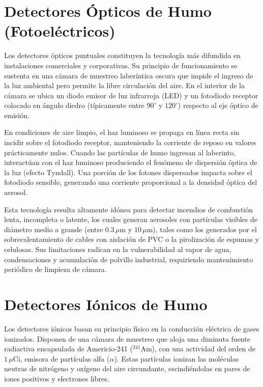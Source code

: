 \section{Detectores Ópticos de Humo (Fotoeléctricos)}

Los detectores ópticos puntuales constituyen la tecnología más difundida en instalaciones comerciales y corporativas. Su
principio de funcionamiento se sustenta en una cámara de muestreo laberíntica oscura que impide el ingreso de la luz
ambiental pero permite la libre circulación del aire. En el interior de la cámara se ubica un diodo emisor de luz
infrarroja (LED) y un fotodiodo receptor colocado en ángulo diedro (típicamente entre $90^\circ$ y $120^\circ$) respecto
al eje óptico de emisión.

En condiciones de aire limpio, el haz luminoso se propaga en línea recta sin incidir sobre el fotodiodo receptor,
manteniendo la corriente de reposo en valores prácticamente nulos. Cuando las partículas de humo ingresan al laberinto,
interactúan con el haz luminoso produciendo el fenómeno de dispersión óptica de la luz (efecto Tyndall). Una porción de
los fotones dispersados impacta sobre el fotodiodo sensible, generando una corriente proporcional a la densidad óptica
del aerosol.

Esta tecnología resulta altamente idónea para detectar incendios de combustión lenta, incompleta o latente, los cuales
generan aerosoles con partículas visibles de diámetro medio a grande (entre $0.3\,\mu\mathrm{m}$ y $10\,\mu\mathrm{m}$),
tales como los generados por el sobrecalentamiento de cables con aislación de PVC o la pirolización de espumas y
celulosas. Sus limitaciones radican en la vulnerabilidad al vapor de agua, condensaciones y acumulación de polvillo
industrial, requiriendo mantenimiento periódico de limpieza de cámara.

\section{Detectores Iónicos de Humo}

Los detectores iónicos basan su principio físico en la conducción eléctrica de gases ionizados. Disponen de una cámara de
muestreo que aloja una diminuta fuente radiactiva encapsulada de Americio-241 ($^{241}\mathrm{Am}$), con una actividad
del orden de $1\,\mu\mathrm{Ci}$, emisora de partículas alfa ($\alpha$). Estas partículas ionizan las moléculas neutras de
nitrógeno y oxígeno del aire circundante, escindiéndolas en pares de iones positivos y electrones libres.

